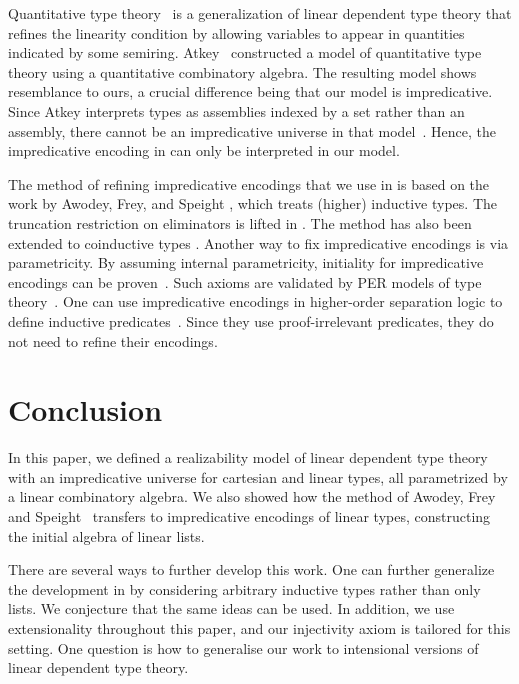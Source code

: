 \documentclass[a4paper,UKenglish,cleveref,numberwithinsect, autoref, thm-restate]{lipics-v2021}
\begin{document}
Quantitative type theory~\cite{atkey:2018,mcbride:2016,nakov:2021}
is a generalization of linear dependent type theory
that refines the linearity condition by allowing variables to
appear in quantities indicated by some semiring.
Atkey~\cite{atkey:2018} constructed a model of quantitative type theory using a quantitative combinatory algebra.
The resulting model shows resemblance to ours,
a crucial difference being that our model is impredicative.
Since Atkey interprets types as assemblies indexed by a set rather than an assembly,
there cannot be an impredicative universe in that model~\cite{phoa:1992}.
Hence, the impredicative encoding in  can only be interpreted in our model. %

The method of refining impredicative encodings that we use in  is based on the work by Awodey, Frey, and Speight \cite{awodey:2018}, which treats (higher) inductive types.
The truncation restriction on eliminators is lifted in \cite{ripollecheveste:2023}.
The method has also been extended to coinductive types \cite{bronsveld:2025}.
Another way to fix impredicative encodings is via parametricity.
By assuming internal parametricity,
initiality for impredicative encodings can be proven~\cite{altenkirch:2024,wadler:2003,wadler:2007}.
Such axioms are validated by PER models of type theory~\cite{krishnaswami:2013}.
One can use impredicative encodings in higher-order separation logic to define inductive predicates~\cite{krebbers:2025}.
Since they use proof-irrelevant predicates,
they do not need to refine their encodings.

\section{Conclusion}\label{sec:conclusion}
In this paper,
we defined a realizability model of linear dependent type theory with an impredicative universe for cartesian and linear types, all parametrized by a linear combinatory algebra.
We also showed how the method of Awodey, Frey and Speight~\cite{awodey:2018} transfers to impredicative encodings of linear types, constructing the initial algebra of linear lists.

There are several ways to further develop this work.
One can further generalize the development in 
by considering arbitrary inductive types rather than only lists.
We conjecture that the same ideas can be used.
In addition,
we use extensionality throughout this paper,
and our injectivity axiom is tailored for this setting.
One question is how to generalise our work to intensional versions of linear dependent type theory.


\end{document}
